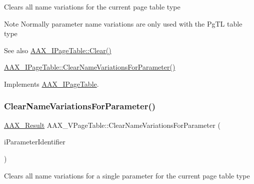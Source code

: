 Clears all name variations for the current page table type

\begin{DoxyNote}{Note}
Normally parameter name variations are only used with the {\ttfamily \textquotesingle{}Pg\+TL\textquotesingle{}} table type
\end{DoxyNote}
\begin{DoxySeeAlso}{See also}
\mbox{\hyperlink{a01849_a00a902ce17c43ae32947dba6088936d2}{A\+A\+X\+\_\+\+I\+Page\+Table\+::\+Clear()}} 

\mbox{\hyperlink{a01849_ae6cf05c366d982e8ea92fea1d98f1d22}{A\+A\+X\+\_\+\+I\+Page\+Table\+::\+Clear\+Name\+Variations\+For\+Parameter()}} 
\end{DoxySeeAlso}


Implements \mbox{\hyperlink{a01849_a6af3965eaf2baeadef9a44aa9c77ecbb}{A\+A\+X\+\_\+\+I\+Page\+Table}}.

\mbox{\label{a01929_a7d1ab121f175fffa26f72e008031ca53}} 
\subsubsection{\texorpdfstring{ClearNameVariationsForParameter()}{ClearNameVariationsForParameter()}}
{\footnotesize\ttfamily \mbox{\hyperlink{a00392_a4d8f69a697df7f70c3a8e9b8ee130d2f}{A\+A\+X\+\_\+\+Result}} A\+A\+X\+\_\+\+V\+Page\+Table\+::\+Clear\+Name\+Variations\+For\+Parameter (\begin{DoxyParamCaption}\item[{\mbox{\hyperlink{a00392_ab4e01b971dac1b25632fd9f710dd8f77}{A\+A\+X\+\_\+\+C\+Page\+Table\+Param\+ID}}}]{i\+Parameter\+Identifier }\end{DoxyParamCaption})\hspace{0.3cm}{\ttfamily [virtual]}}





Clears all name variations for a single parameter for the current page table type

